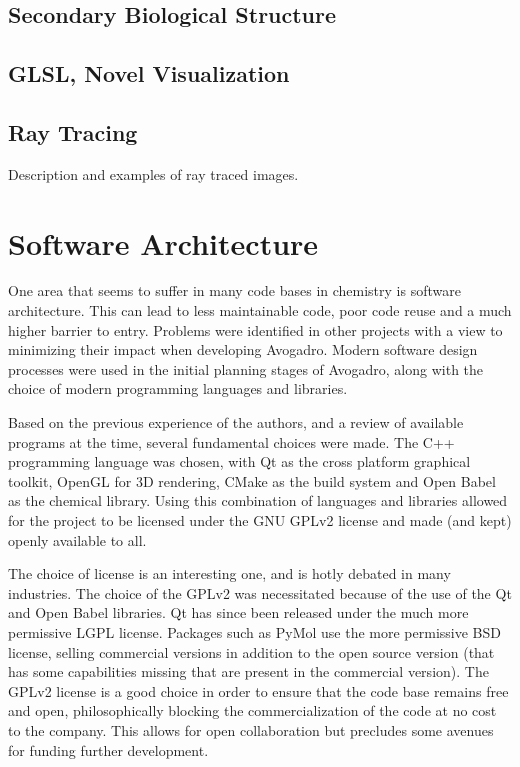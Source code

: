 \documentclass{article}
\begin{document}
\subsection{Secondary Biological Structure}

\subsection{GLSL, Novel Visualization}

\subsection{Ray Tracing}

Description and examples of ray traced images.

\section{Software Architecture}

One area that seems to suffer in many code bases in chemistry is software architecture. This can lead to less maintainable code, poor code reuse and a much higher barrier to entry. Problems were identified in other projects with a view to minimizing their impact when developing Avogadro. Modern software design processes were used in the initial planning stages of Avogadro, along with the choice of modern programming languages and libraries.

Based on the previous experience of the authors, and a review of available programs at the time, several fundamental choices were made. The C++ programming language was chosen, with Qt as the cross platform graphical toolkit, OpenGL for 3D rendering, CMake as the build system and Open Babel as the chemical library. Using this combination of languages and libraries allowed for the project to be licensed under the GNU GPLv2 license and made (and kept) openly available to all.

The choice of license is an interesting one, and is hotly debated in many industries. The choice of the GPLv2 was necessitated because of the use of the Qt and Open Babel libraries. Qt has since been released under the much more permissive LGPL license. Packages such as PyMol use the more permissive BSD license, selling commercial versions in addition to the open source version (that has some capabilities missing that are present in the commercial version). The GPLv2 license is a good choice in order to ensure that the code base remains free and open, philosophically blocking the commercialization of the code at no cost to the company. This allows for open collaboration but precludes some avenues for funding further development.
\end{document}
